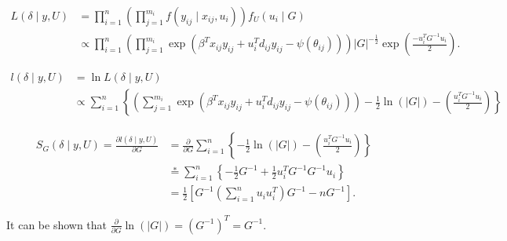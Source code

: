 \documentclass[UTF8,a4paper,10pt]{article}
\begin{document}
\begin{align*}
  L(\delta\mid y,U) 
  &= \prod_{i=1}^n \left(\prod_{j=1}^{m_i} f\left(y_{i j} \mid x_{i j}, u_i\right)\right) f_U\left(u_i \mid G\right)\\
  &\propto \prod_{i=1}^n \left(\prod_{j=1}^{m_i} \exp \left(\beta^T x_{i j} y_{i j}+u_i^T d_{i j} y_{i j}-\psi\left(\theta_{i j}\right)\right)\right)|G|^{-\frac{1}{2}} \exp \left(\frac{-u_i^T G^{-1} u_i}{2}\right).
\end{align*}

\begin{align*}
  l(\delta\mid y,U) 
  &= \ln L(\delta\mid y,U) \\
  &\propto \sum_{i=1}^n 
  \left\{
    \left(\sum_{j=1}^{m_i} \exp \left(\beta^T x_{i j} y_{i j}+u_i^T d_{i j} y_{i j}-\psi\left(\theta_{i j}\right)\right)\right)
    -\frac{1}{2}\ln\left(|G|\right)
     -\left(\frac{u_i^T G^{-1} u_i}{2}\right)
    \right\}
\end{align*}

\begin{align*}
  S_{G}(\delta\mid y, U) = \frac{\partial l(\delta\mid y, U)}{\partial G} 
  & = \frac{\partial }{\partial G} \sum_{i=1}^{n} \left\{-\frac{1}{2}\ln\left(|G|\right)
  -\left(\frac{u_i^T G^{-1} u_i}{2}\right)\right\}\\
  & \overset{*}{=} \sum_{i=1}^{n} \left\{-\frac{1}{2}G^{-1}+\frac{1}{2}u^T_iG^{-1}G^{-1} u_i \right\}\\
  & =\frac{1}{2}\left[G^{-1}\left(\sum_{i=1}^n u_i u_i^T\right) G^{-1}-n G^{-1}\right].
\end{align*}


It can be shown that \(\frac{\partial }{\partial G}\ln(|G|) = (G^{-1})^T = G^{-1}\).
\end{document}
